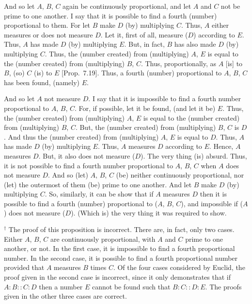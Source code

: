 \begin{Parallel}{}{}
{And so let $A$, $B$, $C$  again be continuously proportional, and let $A$ and $C$ not be prime to one another. I say that it is possible to find
a fourth (number) proportional to them. For let $B$ make $D$ (by) multiplying $C$. Thus, $A$ either measures or does not measure $D$. 
Let it, first of all, measure ($D$) according to $E$. Thus, $A$ has made $D$ (by) multiplying $E$. But, in fact, $B$ has also made $D$ (by) multiplying $C$. Thus, the (number created) from (multiplying) $A$, $E$
is equal to the (number created) from (multiplying) $B$, $C$. Thus, 
proportionally, as $A$ [is] to $B$, (so) $C$ (is) to $E$ [Prop.~7.19]. Thus, a fourth (number) proportional
to $A$, $B$, $C$ has been found, (namely) $E$.

And so let $A$ not measure $D$. I say that it is impossible to find a fourth
number proportional to $A$, $B$, $C$. For, if possible, let it 
be found, (and let it be) $E$. Thus, the (number created) from
(multiplying) $A$, $E$ is equal to the (number created) from (multiplying)
$B$, $C$. But, the (number created) from (multiplying) $B$, $C$ is $D$.
And thus the (number created) from (multiplying) $A$, $E$ is equal to $D$.
Thus, $A$ has made $D$ (by) multiplying $E$. Thus, $A$ measures
$D$ according to $E$. Hence, $A$ measures $D$. But, it also does not
measure ($D$). The very thing (is) absurd. Thus, it is not possible
to find a fourth number proportional to $A$, $B$, $C$ when $A$ does not
measure $D$. And so (let) $A$, $B$, $C$ (be) neither continuously
proportional, nor (let) the outermost of them (be) prime to one another.
And let $B$ make $D$ (by) multiplying $C$. So, similarly, it can be show that
if $A$ measures $D$ then it is possible to find a fourth (number)
proportional to ($A$, $B$, $C$), and impossible if ($A$) does not measure ($D$).
(Which is) the very thing it was required to show.}
\end{Parallel}
{\footnotesize\noindent$^\dag$ The proof of this proposition is incorrect.
There are, in fact, only two cases. Either $A$, $B$, $C$ are continuously
proportional,  with $A$ and $C$ prime to one another, or not. In the first case, 
it is impossible to find a fourth proportional number. In the second case,
it is possible to find a fourth proportional number provided that $A$
measures $B$ times $C$. Of the four cases considered by Euclid,
the proof given in the second case is incorrect, since it only demonstrates that
if $A:B::C:D$ then a number $E$ cannot be found such that $B:C::D:E$. The proofs given in the other three cases are correct.}

